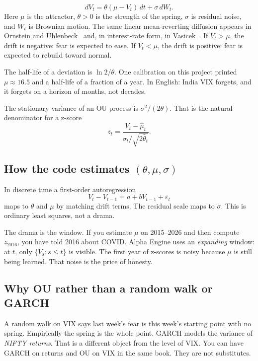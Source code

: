 \documentclass[11pt,a4paper]{article}
\begin{document}
\begin{equation}
  dV_t = \theta(\mu - V_t)\,dt + \sigma\,dW_t.
\end{equation}
Here $\mu$ is the attractor, $\theta>0$ is the strength of the spring, $\sigma$ is residual noise, and $W_t$ is Brownian motion. The same linear mean-reverting diffusion appears in Ornstein and Uhlenbeck~\cite{ou1930} and, in interest-rate form, in Vasicek~\cite{vasicek1977}. If $V_t>\mu$, the drift is negative: fear is expected to ease. If $V_t<\mu$, the drift is positive: fear is expected to rebuild toward normal.

The half-life of a deviation is $\ln 2/\theta$. One calibration on this project printed $\mu\approx 16.5$ and a half-life of a fraction of a year. In English: India VIX forgets, and it forgets on a horizon of months, not decades.

The stationary variance of an OU process is $\sigma^2/(2\theta)$. That is the natural denominator for a z-score
\begin{equation}
  z_t = \frac{V_t-\hat\mu_t}{\sigma_t/\sqrt{2\hat\theta_t}}.
\end{equation}

\subsection{How the code estimates $(\theta,\mu,\sigma)$}

In discrete time a first-order autoregression
\begin{equation}
  V_t - V_{t-1} = a + b V_{t-1} + \varepsilon_t
\end{equation}
maps to $\theta$ and $\mu$ by matching drift terms. The residual scale maps to $\sigma$. This is ordinary least squares, not a drama.

The drama is the window. If you estimate $\mu$ on 2015--2026 and then compute $z_{2016}$, you have told 2016 about COVID. Alpha Engine uses an \emph{expanding} window: at $t$, only $\{V_s:s\le t\}$ is visible. The first year of z-scores is noisy because $\mu$ is still being learned. That noise is the price of honesty.

\subsection{Why OU rather than a random walk or GARCH}

A random walk on VIX says last week's fear is this week's starting point with no spring. Empirically the spring is the whole point. GARCH models the variance of \emph{NIFTY returns}. That is a different object from the level of VIX. You can have GARCH on returns and OU on VIX in the same book. They are not substitutes.
\end{document}
